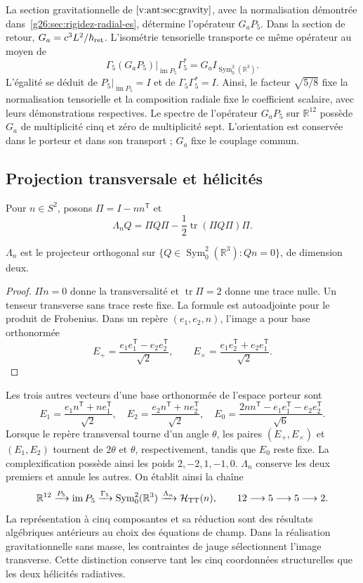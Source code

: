 La section gravitationnelle de \(\ref{v:ant:sec:gravity}\), avec la
normalisation démontrée dans~\ref{g26:sec:rigidez-radial-es}, détermine
l'opérateur \(G_aP_5\). Dans la section de retour,
\(G_a=c^3L^2/\hbar_{\rm ret}\). L'isométrie tensorielle transporte
ce même opérateur au moyen de
\[
 \Gamma_5(G_aP_5)|_{\operatorname{im}P_5}\Gamma_5^*
   =G_a I_{\operatorname{Sym}^2_0(\mathbb R^3)}.
\]
L'égalité se déduit de \(P_5|_{\operatorname{im}P_5}=I\) et de
\(\Gamma_5\Gamma_5^*=I\). Ainsi, le facteur \(\sqrt{5/8}\) fixe la
normalisation tensorielle et la composition radiale fixe le coefficient
scalaire, avec leurs démonstrations respectives.
Le spectre de l'opérateur \(G_aP_5\) sur \(\mathbb R^{12}\)
possède \(G_a\) de multiplicité
cinq et zéro de multiplicité sept. L'orientation est conservée dans
le porteur et dans son transport ; \(G_a\) fixe le couplage commun.

\subsection{Projection transversale et hélicités}
Pour \(n\in S^2\), posons \(\Pi=I-nn^{\mathsf T}\) et
\[
 \Lambda_nQ=\Pi Q\Pi-\frac12\operatorname{tr}(\Pi Q\Pi)\Pi.
\]
\begin{proposition}
\(\Lambda_n\) est le projecteur orthogonal sur \(\{Q\in\operatorname{Sym}^2_0(\mathbb R^3):Qn=0\}\), de dimension deux.
\end{proposition}
\begin{proof}
\(\Pi n=0\) donne la transversalité et \(\operatorname{tr}\Pi=2\) donne
une trace nulle. Un tenseur transverse sans trace reste fixe.
La formule est autoadjointe pour le produit de Frobenius.
Dans un repère \((e_1,e_2,n)\), l'image a pour base orthonormée
\[
 E_+=\frac{e_1e_1^{\mathsf T}-e_2e_2^{\mathsf T}}{\sqrt2},\qquad
 E_\times=\frac{e_1e_2^{\mathsf T}+e_2e_1^{\mathsf T}}{\sqrt2}.
\]
\end{proof}
Les trois autres vecteurs d'une base orthonormée de l'espace porteur sont
\[
 E_1=\frac{e_1n^{\mathsf T}+ne_1^{\mathsf T}}{\sqrt2},\quad
 E_2=\frac{e_2n^{\mathsf T}+ne_2^{\mathsf T}}{\sqrt2},\quad
 E_0=\frac{2nn^{\mathsf T}-e_1e_1^{\mathsf T}-e_2e_2^{\mathsf T}}{\sqrt6}.
\]
Lorsque le repère transversal tourne d'un angle \(\theta\), les paires \((E_+,E_\times)\) et \((E_1,E_2)\) tournent de \(2\theta\) et \(\theta\), respectivement, tandis que \(E_0\) reste fixe. La complexification possède ainsi les poids \(2,-2,1,-1,0\). \(\Lambda_n\) conserve les deux premiers et annule les autres. On établit ainsi la chaîne
\[
 \mathbb R^{12}\xrightarrow{P_5}\operatorname{im}P_5
 \xrightarrow{\Gamma_5}\operatorname{Sym}^2_0(\mathbb R^3)
 \xrightarrow{\Lambda_n}\mathcal H_{\rm TT}(n),
 \qquad 12\longrightarrow5\longrightarrow5\longrightarrow2.
\]
La représentation à cinq composantes et sa réduction sont des résultats
algébriques antérieurs au choix des équations de champ.
Dans la réalisation gravitationnelle sans masse, les contraintes de jauge
sélectionnent l'image transverse. Cette distinction conserve tant les
cinq coordonnées structurelles que les deux hélicités radiatives.
